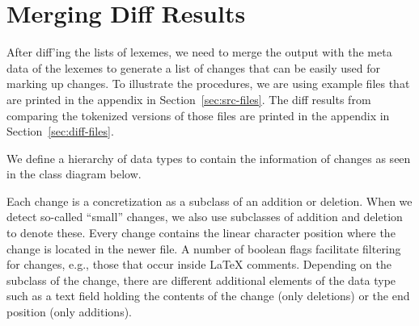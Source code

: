 \section{Merging Diff Results} 

After diff'ing the lists of lexemes, we need to merge the output with the meta data of the lexemes to generate a list of changes that can be easily used for marking up changes.  To illustrate the procedures, we are using example files that are printed in the appendix in Section~\ref{sec:src-files}.  The diff results from comparing the tokenized versions of those files are printed in the appendix in Section~\ref{sec:diff-files}.

We define a hierarchy of data types %
to contain the information of changes as seen in the class diagram below.  


Each change is a concretization as a subclass of an addition or deletion.  When we detect so-called ``small'' changes, we also use subclasses of addition and deletion to denote these.  Every change contains the linear character position where the change is located in the newer file.  A number of boolean flags facilitate filtering for changes, e.g., those that occur inside LaTeX comments.  Depending on the subclass of the change, there are different additional elements of the data type such as a text field holding the contents of the change (only deletions) or the end position (only additions).

